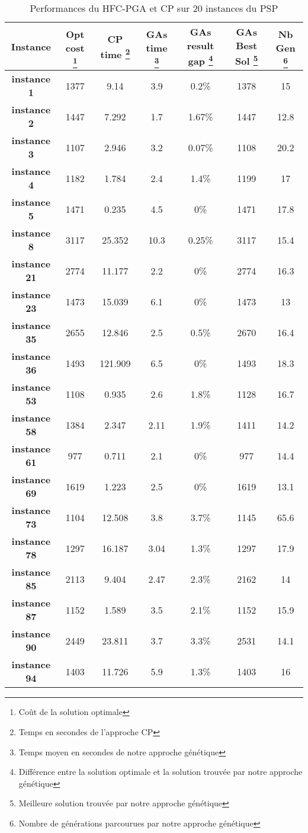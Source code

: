 	\begin{table}[h]
		\centering
		\begin{tabular}{|c|c|c|c|c|c|c|}
			\hline
			\textbf{Instance} & \textbf{Opt cost \footnote{Coût de la solution optimale}} & \textbf{CP time \footnote{Temps en secondes de l'approche CP}} & \textbf{GAs time \footnote{Temps moyen en secondes de notre approche génétique}} & \textbf{GAs result gap \footnote{Différence entre la solution optimale et la solution trouvée par notre approche génétique}} & \textbf{GAs Best Sol \footnote{Meilleure solution trouvée par notre approche génétique}} & \textbf{Nb Gen \footnote{Nombre de générations parcourues par notre approche génétique}}\\
			\hline
			\textbf{instance 1} & 1377 & 9.14 & 3.9 & 0.2\% & 1378 & 15 \\
			\textbf{instance 2} & 1447 & 7.292 & 1.7 & 1.67\% & 1447 & 12.8\\
			\textbf{instance 3} & 1107 & 2.946 & 3.2 & 0.07\% & 1108 & 20.2\\
			\textbf{instance 4} & 1182 & 1.784 & 2.4 & 1.4\% & 1199 & 17\\
			\textbf{instance 5} & 1471 & 0.235 & 4.5 & 0\% & 1471 & 17.8\\
			\textbf{instance 8} & 3117 & 25.352 & 10.3 & 0.25\% & 3117 & 15.4\\
			\textbf{instance 21} & 2774 & 11.177 & 2.2 & 0\% & 2774 & 16.3\\
			\textbf{instance 23} & 1473 & 15.039 & 6.1 & 0\% & 1473 & 13\\
			\textbf{instance 35} & 2655 & 12.846 & 2.5 & 0.5\% & 2670 & 16.4\\
			\textbf{instance 36} & 1493 & 121.909 & 6.5 & 0\% & 1493 & 18.3\\
			\textbf{instance 53} & 1108 & 0.935 & 2.6 & 1.8\% & 1128 & 16.7\\
			\textbf{instance 58} & 1384 & 2.347 & 2.11 & 1.9\% & 1411 & 14.2\\
			\textbf{instance 61} & 977 & 0.711 & 2.1 & 0\% & 977 & 14.4\\
			\textbf{instance 69} & 1619 & 1.223 & 2.5 & 0\% & 1619 & 13.1\\
			\textbf{instance 73} & 1104 & 12.508 & 3.8 & 3.7\% & 1145 & 65.6\\
			\textbf{instance 78} & 1297 & 16.187 & 3.04 & 1.3\% & 1297 & 17.9\\
			\textbf{instance 85} & 2113 & 9.404 & 2.47 & 2.3\% & 2162 & 14\\
			\textbf{instance 87} & 1152 & 1.589 & 3.5 & 2.1\% & 1152 & 15.9\\
			\textbf{instance 90} & 2449 & 23.811 & 3.7 & 3.3\% & 2531 & 14.1\\
			\textbf{instance 94} & 1403 & 11.726 & 5.9 & 1.3\% & 1403 & 16\\
			
			\hline
		\end{tabular}	
		\caption{Performances du HFC-PGA et CP sur 20 instances du PSP}	
		\label{tab:hfc_pga_cp}
	\end{table}			
	
